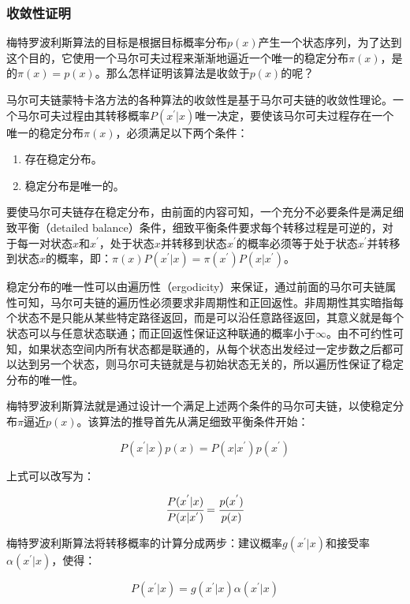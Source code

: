\subsubsection{收敛性证明}
梅特罗波利斯算法的目标是根据目标概率分布$p(x)$产生一个状态序列，为了达到这个目的，它使用一个马尔可夫过程来渐渐地逼近一个唯一的稳定分布$\pi(x)$，是的$\pi(x)=p(x)$。那么怎样证明该算法是收敛于$p(x)$的呢？

马尔可夫链蒙特卡洛方法的各种算法的收敛性是基于马尔可夫链的收敛性理论。一个马尔可夫过程由其转移概率$P(x^{'}|x)$唯一决定，要使该马尔可夫过程存在一个唯一的稳定分布$\pi(x)$，必须满足以下两个条件：

\begin{enumerate}
	\item 存在稳定分布。
	\item 稳定分布是唯一的。
\end{enumerate}

要使马尔可夫链存在稳定分布，由前面的内容可知，一个充分不必要条件是满足细致平衡（detailed balance）条件，细致平衡条件要求每个转移过程是可逆的，对于每一对状态$x$和$x^{'}$，处于状态$x$并转移到状态$x^{'}$的概率必须等于处于状态$x^{'}$并转移到状态$x$的概率，即：$\pi(x)P(x^{'}|x)=\pi(x^{'})P(x|x^{'})$。

稳定分布的唯一性可以由遍历性（ergodicity）来保证，通过前面的马尔可夫链属性可知，马尔可夫链的遍历性必须要求非周期性和正回返性。非周期性其实暗指每个状态不是只能从某些特定路径返回，而是可以沿任意路径返回，其意义就是每个状态可以与任意状态联通；而正回返性保证这种联通的概率小于$\infty$。由不可约性可知，如果状态空间内所有状态都是联通的，从每个状态出发经过一定步数之后都可以达到另一个状态，则马尔可夫链就是与初始状态无关的，所以遍历性保证了稳定分布的唯一性。

梅特罗波利斯算法就是通过设计一个满足上述两个条件的马尔可夫链，以使稳定分布$\pi$逼近$p(x)$。该算法的推导首先从满足细致平衡条件开始：

\begin{equation}
	P(x^{'}|x)p(x)=P(x|x^{'})p(x^{'})
\end{equation}

\noindent 上式可以改写为：

\begin{equation}
	 \cfrac{P(x^{'}|x)}{P(x|x^{'})}= \cfrac{p(x^{'})}{p(x)}
\end{equation}

\noindent 梅特罗波利斯算法将转移概率的计算分成两步：建议概率$g(x^{'}|x)$和接受率$\alpha(x^{'}|x)$，使得：

\begin{equation}
	P(x^{'}|x)=g(x^{'}|x)\alpha(x^{'}|x)
\end{equation}

